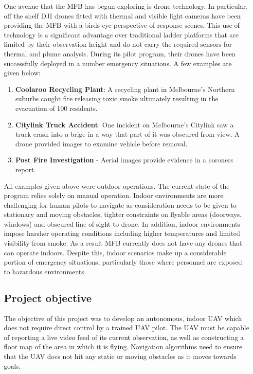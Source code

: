 \documentclass[capstone_report.tex]{subfiles}
\begin{document}
One avenue that the MFB has begun exploring is drone technology.  In particular, off the shelf DJI drones fitted with thermal and visible light cameras have been providing the MFB with a birds eye perspective of response scenes. This use of technology is a significant advantage over traditional ladder platforms that are limited by their observation height and do not carry the required sensors for thermal and plume analysis. During its pilot program, their drones have been successfully deployed in a number emergency situations. A few examples are given below:
\begin{enumerate}
    \item \textbf{Coolaroo Recycling Plant}: A recycling plant in Melbourne's Northern suburbs caught fire releasing toxic smoke ultimately resulting in the evacuation of 100 residents.
    \item \textbf{Citylink Truck Accident}: One incident on Melbourne's Citylink saw a truck crash into a brige in a way that part of it was obscured from view. A drone provided images to examine vehicle before removal.
    \item \textbf{Post Fire Investigation}  - Aerial images provide evidence in a coroners report.
\end{enumerate}

All examples given above were outdoor operations. The current state of the program relies solely on manual operation. Indoor environments are more challenging for human pilots to navigate as consideration needs to be given to stationary and moving obstacles, tighter constraints on flyable areas (doorways, windows) and obscured line of sight to drone. In addition, indoor environments impose harsher operating conditions including higher temperatures and limited visibility from smoke. As a result MFB currently does not have any drones that can operate indoors. Despite this, indoor scenarios make up a considerable portion of emergency situations, particularly those where personnel are exposed to hazardous environments.\\

\subsection{Project objective}
The objective of this project was to develop an autonomous, indoor UAV which does not require direct control by a trained UAV pilot. The UAV must be capable of reporting a live video feed of its current observation, as well as constructing a floor map of the area in which it is flying. Navigation algorithms need to ensure that the UAV does not hit any static or moving obstacles as it moves towards goals.\\
\end{document}
